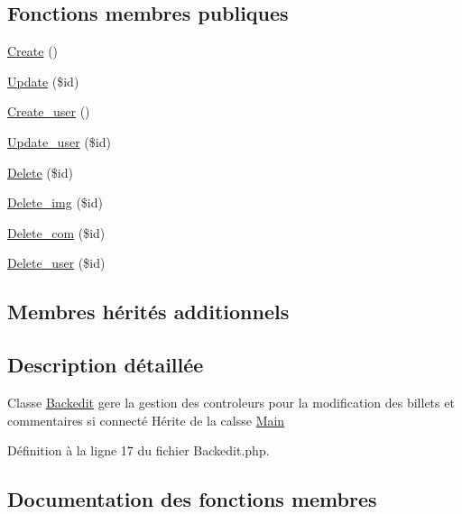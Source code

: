 \subsection*{Fonctions membres publiques}
\begin{DoxyCompactItemize}
\item 
\hyperlink{class_src_1_1_controllers_1_1_backedit_ad01f71fa0ecc039494e3c282864298c3}{Create} ()
\item 
\hyperlink{class_src_1_1_controllers_1_1_backedit_a82232b33fbfacdbdb8a8f49acaecf564}{Update} (\$id)
\item 
\hyperlink{class_src_1_1_controllers_1_1_backedit_af3369c06390987c5f54b6bc444c615ee}{Create\+\_\+user} ()
\item 
\hyperlink{class_src_1_1_controllers_1_1_backedit_ac76a9db7f422d94f155c99c21540da0e}{Update\+\_\+user} (\$id)
\item 
\hyperlink{class_src_1_1_controllers_1_1_backedit_a59113b5ecd1d155db6a4f30af34a1e80}{Delete} (\$id)
\item 
\hyperlink{class_src_1_1_controllers_1_1_backedit_a7da0978ffd29442d84e0d4374cb07e8a}{Delete\+\_\+img} (\$id)
\item 
\hyperlink{class_src_1_1_controllers_1_1_backedit_a38147e014898a3417c74b23e903621b0}{Delete\+\_\+com} (\$id)
\item 
\hyperlink{class_src_1_1_controllers_1_1_backedit_ac8f9af14ff73b939d55940eb2ff886ee}{Delete\+\_\+user} (\$id)
\end{DoxyCompactItemize}
\subsection*{Membres hérités additionnels}


\subsection{Description détaillée}
Classe \hyperlink{class_src_1_1_controllers_1_1_backedit}{Backedit} gere la gestion des controleurs pour la modification des billets et commentaires si connecté Hérite de la calsse \hyperlink{class_src_1_1_controllers_1_1_main}{Main} 

Définition à la ligne 17 du fichier Backedit.\+php.



\subsection{Documentation des fonctions membres}
\mbox{\label{class_src_1_1_controllers_1_1_backedit_ad01f71fa0ecc039494e3c282864298c3}} 
